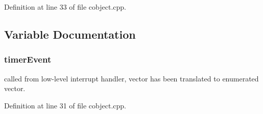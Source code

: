Definition at line 33 of file cobject.\+cpp.



\subsection{Variable Documentation}
\subsubsection[{timer\+Event}]{ timer\+Event\hspace{0.3cm}{\ttfamily [static]}}\label{cobject_8cpp_a6f1376fd36be6b33cb34916bbf993ac1}


called from low-\/level interrupt handler, vector has been translated to enumerated vector. 



Definition at line 31 of file cobject.\+cpp.


